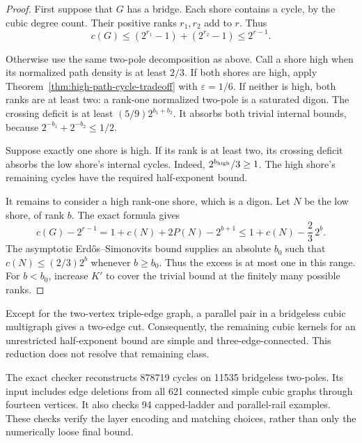 \begin{proof}
First suppose that $G$ has a bridge.
Each shore contains a cycle, by the cubic degree count.
Their positive ranks $r_1,r_2$ add to $r$.
Thus
\[
 c(G)\le(2^{r_1}-1)+(2^{r_2}-1)\le2^{r-1}.
\]

Otherwise use the same two-pole decomposition as above.
Call a shore high when its normalized path density is at least $2/3$.
If both shores are high, apply Theorem~\ref{thm:high-path-cycle-tradeoff} with $\varepsilon=1/6$.
If neither is high, both ranks are at least two: a rank-one normalized two-pole is a saturated digon.
The crossing deficit is at least $(5/9)2^{b_1+b_2}$.
It absorbs both trivial internal bounds, because $2^{-b_1}+2^{-b_2}\le1/2$.

Suppose exactly one shore is high.
If its rank is at least two, its crossing deficit absorbs the low shore's internal cycles.
Indeed, $2^{b_{\rm high}}/3\ge1$.
The high shore's remaining cycles have the required half-exponent bound.

It remains to consider a high rank-one shore, which is a digon.
Let $N$ be the low shore, of rank $b$.
The exact formula gives
\[
 c(G)-2^{r-1}
 =1+c(N)+2P(N)-2^{b+1}
 \le1+c(N)-\frac23\,2^b.
\]
The asymptotic Erd\H{o}s--Simonovits bound supplies an absolute $b_0$ such that
$c(N)\le(2/3)2^b$ whenever $b\ge b_0$.
Thus the excess is at most one in this range.
For $b<b_0$, increase $K'$ to cover the trivial bound at the finitely many possible ranks.
\end{proof}

Except for the two-vertex triple-edge graph, a parallel pair in a bridgeless cubic multigraph gives a two-edge cut.
Consequently, the remaining cubic kernels for an unrestricted half-exponent bound are simple and three-edge-connected.
This reduction does not resolve that remaining class.

The exact checker reconstructs 878719 cycles on 11535 bridgeless two-poles.
Its input includes edge deletions from all 621 connected simple cubic graphs through fourteen vertices.
It also checks 94 capped-ladder and parallel-rail examples.
These checks verify the layer encoding and matching choices, rather than only the numerically loose final bound.
